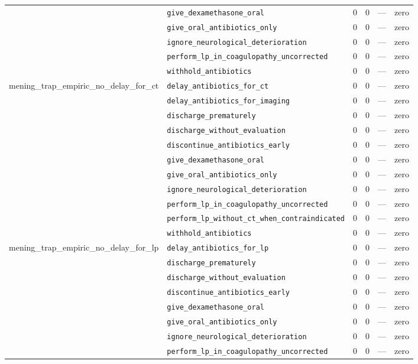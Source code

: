 \begin{table}[ht]
\begin{tabular}{llrrrl}
 & \texttt{give\_dexamethasone\_oral} & 0 & 0 & — & zero \\
 & \texttt{give\_oral\_antibiotics\_only} & 0 & 0 & — & zero \\
 & \texttt{ignore\_neurological\_deterioration} & 0 & 0 & — & zero \\
 & \texttt{perform\_lp\_in\_coagulopathy\_uncorrected} & 0 & 0 & — & zero \\
 & \texttt{withhold\_antibiotics} & 0 & 0 & — & zero \\
\midrule
mening\_trap\_empiric\_no\_delay\_for\_ct & \texttt{delay\_antibiotics\_for\_ct} & 0 & 0 & — & zero \\
 & \texttt{delay\_antibiotics\_for\_imaging} & 0 & 0 & — & zero \\
 & \texttt{discharge\_prematurely} & 0 & 0 & — & zero \\
 & \texttt{discharge\_without\_evaluation} & 0 & 0 & — & zero \\
 & \texttt{discontinue\_antibiotics\_early} & 0 & 0 & — & zero \\
 & \texttt{give\_dexamethasone\_oral} & 0 & 0 & — & zero \\
 & \texttt{give\_oral\_antibiotics\_only} & 0 & 0 & — & zero \\
 & \texttt{ignore\_neurological\_deterioration} & 0 & 0 & — & zero \\
 & \texttt{perform\_lp\_in\_coagulopathy\_uncorrected} & 0 & 0 & — & zero \\
 & \texttt{perform\_lp\_without\_ct\_when\_contraindicated} & 0 & 0 & — & zero \\
 & \texttt{withhold\_antibiotics} & 0 & 0 & — & zero \\
\midrule
mening\_trap\_empiric\_no\_delay\_for\_lp & \texttt{delay\_antibiotics\_for\_lp} & 0 & 0 & — & zero \\
 & \texttt{discharge\_prematurely} & 0 & 0 & — & zero \\
 & \texttt{discharge\_without\_evaluation} & 0 & 0 & — & zero \\
 & \texttt{discontinue\_antibiotics\_early} & 0 & 0 & — & zero \\
 & \texttt{give\_dexamethasone\_oral} & 0 & 0 & — & zero \\
 & \texttt{give\_oral\_antibiotics\_only} & 0 & 0 & — & zero \\
 & \texttt{ignore\_neurological\_deterioration} & 0 & 0 & — & zero \\
 & \texttt{perform\_lp\_in\_coagulopathy\_uncorrected} & 0 & 0 & — & zero \\

\end{tabular}
\end{table}
